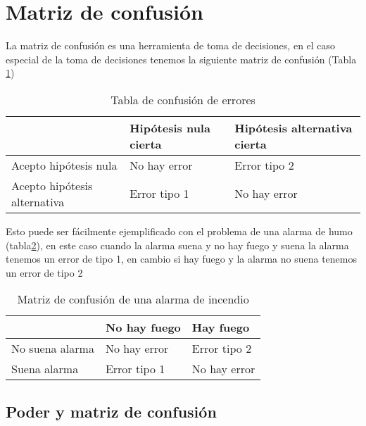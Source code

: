 \documentclass[]{book}
\begin{document}
\hypertarget{matriz-de-confusion}{%
\section{Matriz de confusión}\label{matriz-de-confusion}}

La matriz de confusión es una herramienta de toma de decisiones, en el caso especial de la toma de decisiones tenemos la siguiente matriz de confusión (Tabla \ref{tab:errores})

\begin{table}

\caption{\label{tab:errores}Tabla de confusión de errores}
\centering
\begin{tabular}[t]{l|l|l}
\hline
  & Hipótesis nula cierta & Hipótesis alternativa cierta\\
\hline
Acepto hipótesis nula & No hay error & Error tipo 2\\
\hline
Acepto hipótesis alternativa & Error tipo 1 & No hay error\\
\hline
\end{tabular}
\end{table}

Esto puede ser fácilmente ejemplificado con el problema de una alarma de humo (tabla\ref{tab:Confucion}), en este caso cuando la alarma suena y no hay fuego y suena la alarma tenemos un error de tipo 1, en cambio si hay fuego y la alarma no suena tenemos un error de tipo 2

\begin{table}

\caption{\label{tab:Confucion}Matriz de confusión de una alarma de incendio}
\centering
\begin{tabular}[t]{lll}
\toprule
  & No hay fuego & Hay fuego\\
\midrule
No suena alarma & No hay error & Error tipo 2\\
Suena alarma & Error tipo 1 & No hay error\\
\bottomrule
\end{tabular}
\end{table}

\hypertarget{poder-y-matriz-de-confusion}{%
\subsection{Poder y matriz de confusión}\label{poder-y-matriz-de-confusion}}
\end{document}
